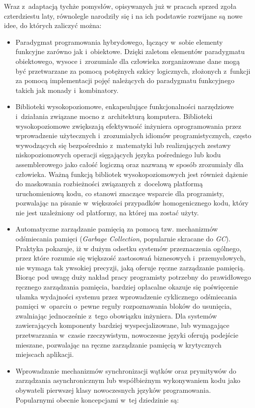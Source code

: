 \par{
Wraz z~adaptacją tychże pomysłów, opisywanych już w pracach sprzed zgoła czterdziestu laty, równolegle narodziły się i na ich podstawie rozwijane są nowe idee, do których zaliczyć można:
\begin{itemize}
  \item Paradygmat programowania hybrydowego, łączący w~sobie elementy funkcyjne zarówno jak i~obiektowe. Dzięki zaletom elementów paradygmatu obiektowego, wysoce i~zrozumiale dla człowieka zorganizowane dane mogą być przetwarzane za pomocą potężnych szkicy logicznych, złożonych z~funkcji za pomocą implementacji pojęć należących do paradygmatu funkcyjnego takich jak monady i~kombinatory.
  \item Biblioteki wysokopoziomowe, enkapsulujące funkcjonalności narzędziowe i~działania związane mocno z~architekturą komputera. Biblioteki wysokopoziomowe zwiększają efektywność inżyniera oprogramowania przez wprowadzenie użytecznych i~zrozumiałych idiomów programistycznych, często wywodzących się bezpośrednio z~matematyki lub realizujących zestawy niskopoziomowych operacji sięgających języka pośredniego lub kodu assemblerowego jako całość logiczną oraz nazwaną w sposób zrozumiały dla człowieka. Ważną funkcją bibliotek wysokopoziomowych jest również dążenie do maskowania rozbieżności związanych z~docelową platformą uruchomieniową kodu, co stanowi znaczące wsparcie dla programisty, pozwalając na pisanie w~większości przypadków homogenicznego kodu, który nie jest uzależniony od platformy, na której ma zostać użyty.
  \item Automatyczne zarządzanie pamięcią za pomocą tzw. mechanizmów odśmiecania pamięci (\emph{Garbage Collection}, popularnie skracane do \emph{GC}). Praktyka pokazuje, iż w dużym odsetku systemów przeznaczenia ogólnego, przez które rozumie się większość zastosowań biznesowych i~przemysłowych, nie wymaga tak ywsokiej precyzji, jaką oferuje ręczne zarządzanie pamięcią. Biorąc pod uwagę duży nakład pracy programisty potrzebny do prawidłowego ręcznego zarządzania pamięcia, bardziej opłacalne okazuje się poświęcenie ułamka wydajności systemu przez wprowadzenie cyklicznego odśmiecania pamięci w~oparciu o~pewne reguły rozpoznawania bloków do usunięcia, zwalniając jednocześnie z~tego obowiązku inżyniera. Dla systemów zawierających komponenty bardziej wyspecjalizowane, lub wymagające przetwarzania w~czasie rzeczywistym, nowoczesne języki oferują podejście mieszane, pozwalając na ręczne zarządzanie pamięcią w krytycznych miejscach aplikacji.
  \item Wprowadzanie mechanizmów synchronizacji wątków oraz prymitywów do zarządzania asynchronicznym lub współbieżnym wykonywaniem kodu jako obywateli pierwszej klasy nowoczesnych języków programowania. Popularnymi obecnie koncepcjami w~tej dziedzinie są:

\end{itemize}}

